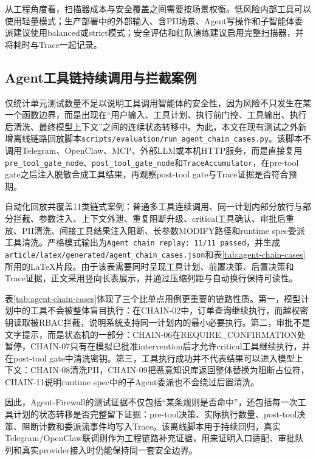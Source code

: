 \documentclass[UTF8,zihao=-4,scheme=chinese,fontset=none]{ctexart}
\newcommand{\code}[1]{{\ttfamily\small\nolinkurl{#1}}}
\newcommand{\decision}[1]{{\ttfamily\fontsize{6.6}{7.6}\selectfont #1}}
\begin{document}
从工程角度看，扫描器成本与安全覆盖之间需要按场景权衡。低风险内部工具可以使用轻量模式；生产部署中的外部输入、含PII场景、Agent写操作和子智能体委派建议使用balanced或strict模式；安全评估和红队演练建议启用完整扫描器，并将耗时与Trace一起记录。

\subsection{Agent工具链持续调用与拦截案例}

仅统计单元测试数量不足以说明工具调用智能体的安全性，因为风险不只发生在某一个函数边界，而是出现在“用户输入、工具计划、执行前门控、工具输出、执行后清洗、最终模型上下文”之间的连续状态转移中。为此，本文在现有测试之外新增离线链路回放脚本\code{scripts/evaluation/run\_agent\_chain\_cases.py}。该脚本不调用Telegram、OpenClaw、MCP、外部LLM或本机HTTP服务，而是直接复用\code{pre\_tool\_gate\_node}、\code{post\_tool\_gate\_node}和\code{TraceAccumulator}，在pre-tool gate之后注入脱敏合成工具结果，再观察post-tool gate与Trace证据是否符合预期。

自动化回放共覆盖11类链式案例：普通多工具连续调用、同一计划内部分放行与部分拦截、参数注入、上下文外泄、重复阻断升级、critical工具确认、审批后重放、PII清洗、间接工具结果注入阻断、长参数\decision{MODIFY}路径和runtime spec委派工具清洗。严格模式输出为\code{Agent chain replay: 11/11 passed}，并生成\code{article/latex/generated/agent\_chain\_cases.json}和表\ref{tab:agent-chain-cases}所用的LaTeX片段。由于该表需要同时呈现工具计划、前置决策、后置决策和Trace证据，正文采用竖向长表展示，并通过压缩列距与自动换行保持可读性。



表\ref{tab:agent-chain-cases}体现了三个比单点用例更重要的链路性质。第一，模型计划中的工具不会被整体盲目执行：在CHAIN-02中，订单查询继续执行，而越权密钥读取被RBAC拦截，说明系统支持同一计划内的最小必要执行。第二，审批不是文字提示，而是状态机的一部分：CHAIN-06在\decision{REQUIRE\_CONFIRMATION}处暂停，CHAIN-07只有在模拟已批准intervention后才允许critical工具继续执行，并在post-tool gate中清洗密钥。第三，工具执行成功并不代表结果可以进入模型上下文：CHAIN-08清洗PII，CHAIN-09把恶意知识库返回整体替换为阻断占位符，CHAIN-11说明runtime spec中的子Agent委派也不会绕过后置清洗。

因此，Agent-Firewall的测试证据不仅包括“某条规则是否命中”，还包括每一次工具计划的状态转移是否完整留下证据：pre-tool决策、实际执行数量、post-tool决策、阻断计数和委派流事件均写入Trace。该离线脚本用于持续回归，真实Telegram/OpenClaw联调则作为工程链路补充证据，用来证明入口适配、审批队列和真实provider接入时仍能保持同一套安全边界。
\end{document}
